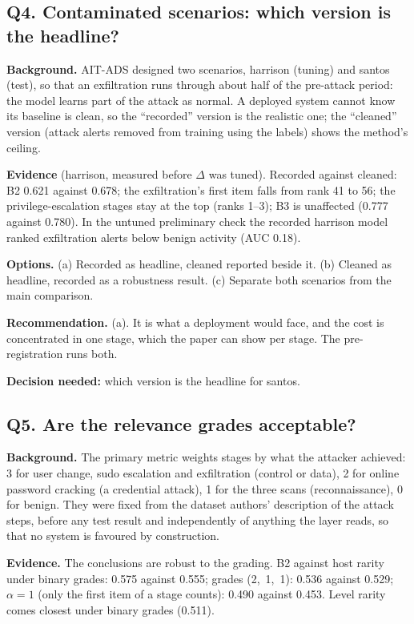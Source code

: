\documentclass[10.5pt,a4paper]{article}
\newcommand{\rec}[1]{\par\smallskip\noindent\colorbox{gray!12}{\parbox{\dimexpr\linewidth-2\fboxsep}{\textbf{Recommendation.} #1}}\par\smallskip}
\newcommand{\ask}[1]{\par\noindent\textbf{Decision needed:} #1\par\medskip}
\newcommand{\sub}[1]{\par\smallskip\noindent\textbf{#1}\quad}
\begin{document}
\subsection*{Q4. Contaminated scenarios: which version is the headline?}

\sub{Background.} AIT-ADS designed two scenarios, harrison (tuning) and santos (test), so that an exfiltration runs through about half of the pre-attack period: the model learns part of the attack as normal. A deployed system cannot know its baseline is clean, so the ``recorded'' version is the realistic one; the ``cleaned'' version (attack alerts removed from training using the labels) shows the method's ceiling.

\sub{Evidence} (harrison, measured before $\Delta$ was tuned). Recorded against cleaned: B2 0.621 against 0.678; the exfiltration's first item falls from rank 41 to 56; the privilege-escalation stages stay at the top (ranks 1--3); B3 is unaffected (0.777 against 0.780). In the untuned preliminary check the recorded harrison model ranked exfiltration alerts below benign activity (AUC 0.18).

\sub{Options.} (a) Recorded as headline, cleaned reported beside it. (b) Cleaned as headline, recorded as a robustness result. (c) Separate both scenarios from the main comparison.

\rec{(a). It is what a deployment would face, and the cost is concentrated in one stage, which the paper can show per stage. The pre-registration runs both.}
\ask{which version is the headline for santos.}

\subsection*{Q5. Are the relevance grades acceptable?}

\sub{Background.} The primary metric weights stages by what the attacker achieved: 3 for user change, sudo escalation and exfiltration (control or data), 2 for online password cracking (a credential attack), 1 for the three scans (reconnaissance), 0 for benign. They were fixed from the dataset authors' description of the attack steps, before any test result and independently of anything the layer reads, so that no system is favoured by construction.

\sub{Evidence.} The conclusions are robust to the grading. B2 against host rarity under binary grades: 0.575 against 0.555; grades (2,~1,~1): 0.536 against 0.529; $\alpha = 1$ (only the first item of a stage counts): 0.490 against 0.453. Level rarity comes closest under binary grades (0.511).
\end{document}
